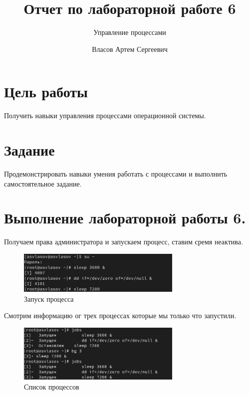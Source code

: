 \documentclass[
  12pt,
  a4paper,
  DIV=11,
  numbers=noendperiod]{scrreprt}
\title{Отчет по лабораторной работе 6}
\subtitle{Управление процессами}
\author{Власов Артем Сергеевич}
\date{}
\renewcommand*\contentsname{Содержание}
\newcommand\contentsname{Содержание}
\begin{document}
\maketitle

\renewcommand*\contentsname{Содержание}
{
\setcounter{tocdepth}{1}
\tableofcontents
}
\listoffigures
\listoftables
{}
\chapter{Цель
работы}\label{ux446ux435ux43bux44c-ux440ux430ux431ux43eux442ux44b}

Получить навыки управления процессами операционной системы.

\chapter{Задание}\label{ux437ux430ux434ux430ux43dux438ux435}

Продемонстрировать навыки умения работать с процессами и выполнить
самостоятельное задание.

\chapter{Выполнение лабораторной работы
6.}\label{ux432ux44bux43fux43eux43bux43dux435ux43dux438ux435-ux43bux430ux431ux43eux440ux430ux442ux43eux440ux43dux43eux439-ux440ux430ux431ux43eux442ux44b-6.}

Получаем права администратора и запускаем процесс, ставим сремя
неактива.

\begin{figure}

{\centering \includegraphics[width=0.7\textwidth,height=\textheight]{image/1.png}

}

\caption{Запуск процесса}

\end{figure}%

Смотрим информацию ог трех процессах которые мы только что запустили.

\begin{figure}

{\centering \includegraphics[width=0.7\textwidth,height=\textheight]{image/2.png}

}

\caption{Список процессов}

\end{figure}%
\end{document}
